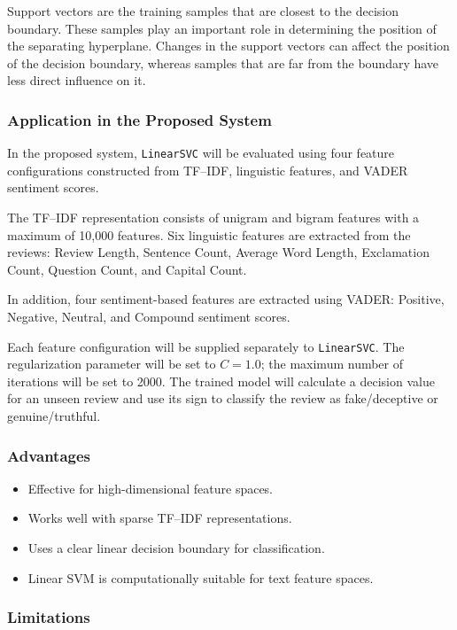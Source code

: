 \documentclass[12pt,a4paper]{report}
\begin{document}
Support vectors are the training samples that are closest to the decision boundary. These samples play an important role in determining the position of the separating hyperplane. Changes in the support vectors can affect the position of the decision boundary, whereas samples that are far from the boundary have less direct influence on it.

\subsubsection*{Application in the Proposed System}

In the proposed system, \texttt{LinearSVC} will be evaluated using four feature configurations constructed from TF--IDF, linguistic features, and VADER sentiment scores.

The TF--IDF representation consists of unigram and bigram features with a maximum of 10,000 features. Six linguistic features are extracted from the reviews: Review Length, Sentence Count, Average Word Length, Exclamation Count, Question Count, and Capital Count.

In addition, four sentiment-based features are extracted using VADER: Positive, Negative, Neutral, and Compound sentiment scores.

Each feature configuration will be supplied separately to \texttt{LinearSVC}. The regularization parameter will be set to \(C=1.0\); the maximum number of iterations will be set to 2000. The trained model will calculate a decision value for an unseen review and use its sign to classify the review as fake/deceptive or genuine/truthful.

\subsubsection*{Advantages}

\begin{itemize}
    \item Effective for high-dimensional feature spaces.
    \item Works well with sparse TF--IDF representations.
    \item Uses a clear linear decision boundary for classification.
    \item Linear SVM is computationally suitable for text feature spaces.
\end{itemize}

\subsubsection*{Limitations}
\end{document}
